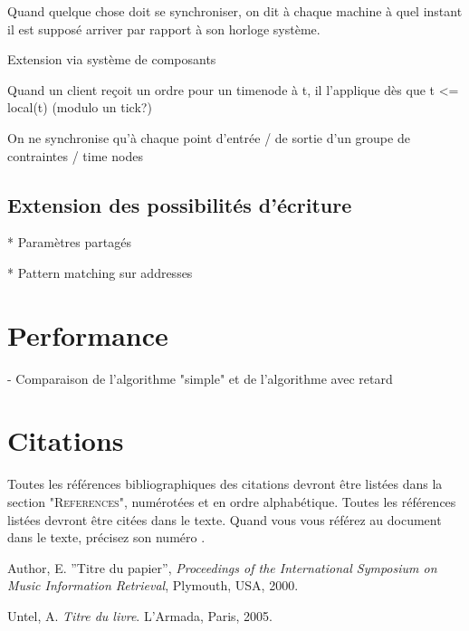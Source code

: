 \documentclass{article}
\begin{document}
Quand quelque chose doit se synchroniser, on dit à chaque machine à quel instant il est supposé arriver par rapport à son horloge système.

Extension via système de composants

Quand un client reçoit un ordre pour un timenode à t, il l'applique dès que t <= local(t) (modulo un tick?)

On ne synchronise qu'à chaque point d'entrée / de sortie d'un groupe de contraintes / time nodes
\subsection{Extension des possibilités d'écriture}
* Paramètres partagés

* Pattern matching sur addresses 

\section{Performance}
- Comparaison de l'algorithme "simple" et de l'algorithme avec retard
\section{Citations}

Toutes les références bibliographiques des citations devront être listées dans la section "\textsc{References}", numérotées et en ordre alphabétique. Toutes les références  listées devront être citées dans le texte. Quand  vous vous référez au document dans le texte, précisez son numéro \cite{Author:00}.

\begin{thebibliography}{2}

 Author, E.
''Titre du papier'',
{\it Proceedings of the International Symposium on Music Information
Retrieval}, Plymouth, USA, 2000.

 Untel, A.
{\it  Titre du livre}.
L'Armada, Paris, 2005.

\end{thebibliography}
\end{document}
